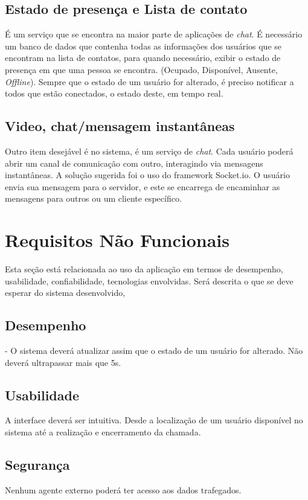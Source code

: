 \documentclass[12pt,a4paper,oneside]{report}
\begin{document}
\subsection{Estado de presença e Lista de contato}
É um serviço que se encontra na maior parte de aplicações de \textit{chat}. É necessário um banco de dados que contenha todas as informações dos usuários que se encontram na lista de contatos, para quando necessário, exibir o estado de presença em que uma pessoa se encontra. (Ocupado, Disponível, Ausente, \textit{Offline}). Sempre que o estado de um usuário for alterado, é preciso notificar a todos que estão conectados, o estado deste, em tempo real.

\subsection{Video, chat/mensagem instantâneas}
Outro item desejável é no sistema, é um serviço de \textit{chat}. Cada usuário poderá abrir um canal de comunicação com outro, interagindo via mensagens instantâneas. 
A solução sugerida foi o uso do framework Socket.io. O usuário envia sua mensagem para o servidor, e este se encarrega de encaminhar as mensagens para outros ou um cliente específico.

\section{Requisitos Não Funcionais}
Esta seção está relacionada ao uso da aplicação em termos de desempenho, usabilidade, confiabilidade, tecnologias envolvidas. Será descrita o que se deve esperar do sistema desenvolvido, 

\subsection{Desempenho}
 - O sistema deverá atualizar assim que o estado de um usuário for alterado. Não deverá ultrapassar mais que 5s.

\subsection{Usabilidade}
A interface deverá ser intuitiva. Desde a localização de um usuário disponível no sistema até a realização e encerramento da chamada.

\subsection{Segurança}
Nenhum agente externo poderá ter acesso aos dados trafegados.
\end{document}
